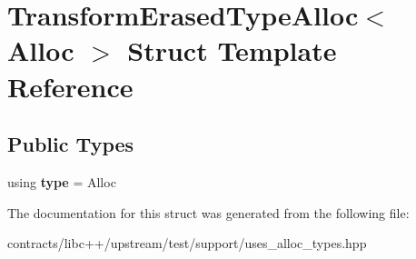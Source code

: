 \hypertarget{struct_transform_erased_type_alloc}{}\section{Transform\+Erased\+Type\+Alloc$<$ Alloc $>$ Struct Template Reference}
\label{struct_transform_erased_type_alloc}
\subsection*{Public Types}
\begin{DoxyCompactItemize}
\item 
\mbox{\label{struct_transform_erased_type_alloc_a88920013fcdeeb39fb3a5e1aa3f1daa3}} 
using {\bfseries type} = Alloc
\end{DoxyCompactItemize}


The documentation for this struct was generated from the following file\+:\begin{DoxyCompactItemize}
\item 
contracts/libc++/upstream/test/support/uses\+\_\+alloc\+\_\+types.\+hpp\end{DoxyCompactItemize}
